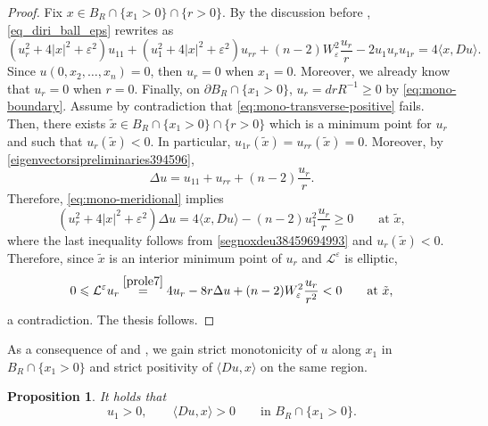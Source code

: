 \documentclass[11pt]{amsart}
\renewcommand{\leq}{\leqslant}
\renewcommand{\geq}{\geqslant}
\renewcommand{\le}{<}
\renewcommand{\ge}{>}
\newcommand{\eps}{\varepsilon}
\newcommand{\Le}{\mathcal L^\eps}
\newtheorem{proposition}[theorem]{Proposition}
\theoremstyle{definition}
\theoremstyle{remark}
\numberwithin{equation}{section}
\begin{document}
\begin{proof}
Fix $x\in B_R\cap \{x_1\ge 0\}\cap \{r\ge 0\}$. By the discussion before , \eqref{eq_diri_ball_eps} rewrites as
\begin{equation}\label{eq:mono-meridional}
 (u_r^2+4|x|^2+\varepsilon^2)u_{11}
   +(u_1^2+4|x|^2+\varepsilon^2)u_{rr}+(n-2)W_\varepsilon^2\frac{u_r}{r}-2u_1u_r u_{1r}
=4\langle x,Du\rangle.
\end{equation}
Since $u(0,x_2,\ldots,x_n)=0$, then $u_r=0$ when $x_1=0$. Moreover, we already know that $u_r=0$ when $r=0$. Finally, on $\partial B_R\cap\{x_1\ge 0\}$, $u_r=d rR^{-1}\geq 0$ by \eqref{eq:mono-boundary}. Assume by contradiction that \eqref{eq:mono-transverse-positive} fails. Then, there exists $\tilde x\in B_R\cap\{x_1\ge 0\}\cap \{r\ge 0\}$ which is a minimum point for $u_r$ and such that $u_r(\tilde x)\le 0$. In particular, $u_{1r}(\tilde x)=u_{rr}(\tilde x)=0$. Moreover, by \eqref{eigenvectorsipreliminaries394596},  
\begin{equation}\label{laplacianincoordinatesdfrfr}
    \Delta u=u_{11}+u_{rr}+(n-2)\frac{u_r}{r}.
\end{equation}
Therefore, \eqref{eq:mono-meridional} implies 
\[
(u_r^2+4|x|^2+\varepsilon^2)\Delta u
 =4\langle x,Du\rangle-(n-2)u_1^2\frac{u_r}{r}\geq0\qquad\text{at }\tilde x,
\]
where the last inequality follows from \eqref{segnoxdeu38459694993} and $u_r(\tilde x)<0$. 
Therefore, since $\tilde x$ is an interior minimum point of $u_r$ and $\Le$ is elliptic,
\begin{equation*}
 0\leq \Le u_r\overset{\eqref{prole7}}{=}4u_r-8r\Delta u+(n-2)W_\varepsilon^2\frac{u_r}{r^2}\le 0\qquad \text{at }\tilde x,
\end{equation*}
a contradiction. The thesis follows.
\end{proof}
As a consequence of  and  , we gain strict monotonicity of $u$ along $x_1$ in $B_R\cap\{x_1\ge 0\}$ and strict positivity of $\langle Du,x\rangle$ on the same region.
\begin{proposition}\label{prop:mono-positive}
It holds that 
\begin{equation}\label{eq:mono-first-positive}
 u_1>0,\qquad \langle Du,x\rangle\ge 0\qquad\text{in }B_R\cap\{x_1\ge 0\}.
\end{equation}
\end{proposition}
\end{document}
